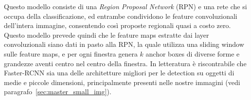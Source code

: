 Questo modello consiste di una \textit{Region Proposal Network} (RPN) e una rete che si occupa della classificazione, ed entrambe condividono le feature convoluzionali dell'intera immagine, consentendo così proposte regionali quasi a costo zero. Questo modello prevede quindi che le feature maps estratte dai layer convoluzionali siano dati in pasto alla RPN, la quale utilizza una sliding window sulle feature maps, e per ogni finestra genera $k$ anchor boxes di diverse forme e grandezze aventi centro nel centro della finestra. In letteratura è riscontrabile che Faster-RCNN sia una delle architetture migliori per le detection su oggetti di medie e piccole dimensioni, principalmente presenti nelle nostre immagini (vedi paragrafo~\ref{sec:master_small_img}).
